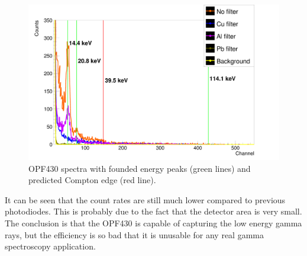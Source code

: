 \begin{figure}[H]
 \centering
 \includegraphics[scale=0.125, angle = 0]{./pictures/OPF430GammaTest.png}
 \caption{OPF430 spectra with founded energy peaks (green lines) and predicted Compton edge (red line).}
 \label{OPF430 spectra}
 
\end{figure}
It can be seen that the count rates are still much lower compared to previous photodiodes. This is probably due to the fact that the detector area is very small. The conclusion is that the OPF430 is capable of capturing the low energy gamma rays, but the efficiency is so bad that it is unusable for any real gamma spectroscopy application.
